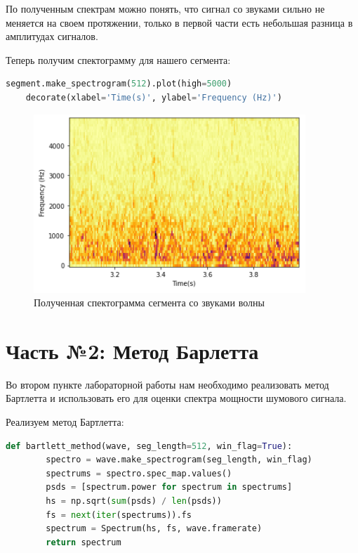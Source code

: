 \documentclass[a4paper]{article}
\begin{document}
            По полученным спектрам можно понять, что сигнал со звуками сильно не меняется на своем протяжении, только в первой части есть небольшая разница в амплитудах сигналов.
            
            Теперь получим спектограмму для нашего сегмента:
            
\begin{lstlisting}[language=Python, caption= Получение спектограммы для сегмента]
    segment.make_spectrogram(512).plot(high=5000)
    decorate(xlabel='Time(s)', ylabel='Frequency (Hz)')
\end{lstlisting}               
            
            \begin{figure}[H]
                \centering
                \includegraphics{ex_1_wave_spectogramma.png}
                \caption{Полученная спектограмма сегмента со звуками волны}
                \label{fig:ex_1_wave_spectogramma}
            \end{figure}
    
    \newpage
        \section{Часть №2: Метод Барлетта}
           Во втором пункте лабораторной работы нам необходимо реализовать метод Бартлетта и использовать его для оценки спектра мощности шумового сигнала.
           
           Реализуем метод Бартлетта:
           
\begin{lstlisting}[language=Python, caption= Реализованный метод Бартлетта]
    def bartlett_method(wave, seg_length=512, win_flag=True):
        spectro = wave.make_spectrogram(seg_length, win_flag)
        spectrums = spectro.spec_map.values()
        psds = [spectrum.power for spectrum in spectrums]
        hs = np.sqrt(sum(psds) / len(psds))
        fs = next(iter(spectrums)).fs
        spectrum = Spectrum(hs, fs, wave.framerate)
        return spectrum
\end{lstlisting}      
           
\end{document}
